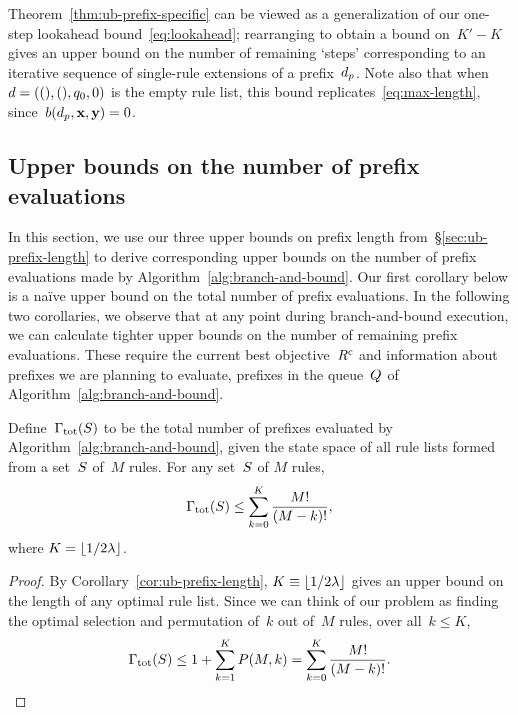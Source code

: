 Theorem~\ref{thm:ub-prefix-specific} can be viewed as a generalization
of our one-step lookahead bound~\eqref{eq:lookahead};
rearranging to obtain a bound on~${K' - K}$
gives an upper bound on the number of remaining `steps' corresponding
to an iterative sequence of single-rule extensions of a prefix~$d_p$.
%
Note also that when~${{d} = ((), (), q_0, 0)}$ is the empty rule list,
this bound replicates~\eqref{eq:max-length}, since~${b(d_p, \mathbf{x}, \mathbf{y}) = 0}$.

\subsection{Upper bounds on the number of prefix evaluations}
\label{sec:ub-size}

In this section, we use our three upper bounds on prefix length
from~\S\ref{sec:ub-prefix-length} to derive corresponding
upper bounds on the number of prefix evaluations made by
Algorithm~\ref{alg:branch-and-bound}.
%
Our first corollary below is a na\"ive upper bound on
the total number of prefix evaluations.
%
In the following two corollaries, we observe that at any point during
branch-and-bound execution, we can calculate tighter upper bounds
on the number of remaining prefix evaluations.
%
These require the current best objective~${R^c}$
and information about prefixes we are planning to evaluate,
\ie prefixes in the queue~$Q$ of Algorithm~\ref{alg:branch-and-bound}.

\begin{corollary}
\label{thm:ub-total-eval}
%
Define~${\Gamma_{\textnormal{tot}}}(S)$ to be the total number of prefixes
evaluated by Algorithm~\ref{alg:branch-and-bound}, given the state space of
all rule lists formed from a set~$S$ of~$M$ rules.
%
For any set~$S$ of $M$ rules,
\begin{align}
\TotalRemaining(\RuleSet) \le \sum_{k=0}^K \frac{M!}{(M - k)!},
\label{eq:size-naive}
\end{align}
where ${K = \lfloor 1/2 {\lambda} \rfloor}$.
\end{corollary}

\begin{proof}
By Corollary~\ref{cor:ub-prefix-length},
${K \equiv \lfloor 1 / 2 {\lambda} \rfloor}$
gives an upper bound on the length of any optimal rule list.
%
Since we can think of our problem as finding the optimal
selection and permutation of~$k$ out of~$M$ rules,
over all~${k \le K}$,
\begin{align}
\TotalRemaining(\RuleSet) \le 1 + \sum_{k=1}^K P(M, k)
= \sum_{k=0}^K \frac{M!}{(M - k)!}.
\end{align}
\end{proof}

